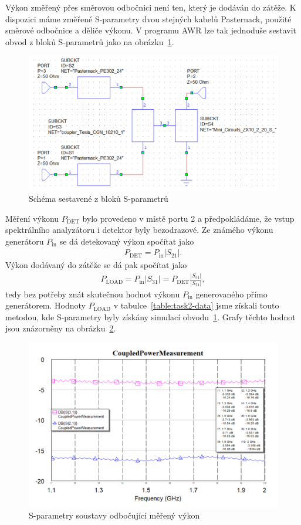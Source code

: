 \documentclass[11pt,a4paper]{article}
\begin{document}
Výkon změřený přes směrovou odbočnici není ten, který je dodáván do zátěže. K dispozici máme změřené S-parametry dvou stejných kabelů Pasternack, použité směrové odbočnice a děliče výkonu. V programu AWR lze tak jednoduše sestavit obvod z bloků S-parametrů jako na obrázku~\ref{fig:task2-sparametry}.
\begin{figure}[!ht]
    \centering
    \includegraphics[width=.8\textwidth]{src/task2-sparametry.png}
    \caption{\label{fig:task2-sparametry}Schéma sestavené z bloků S-parametrů}
\end{figure}
Měření výkonu $P_{\mathrm{DET}}$ bylo provedeno v místě portu 2 a předpokládáme, že vstup spektrálního analyzátoru i detektor byly bezodrazové. Ze známého výkonu generátoru $P_{\mathrm{in}}$ se dá detekovaný výkon spočítat jako
\begin{align}
    P_{\mathrm{DET}} = P_{\mathrm{in}} \left|S_{21}\right|.
\end{align}
Výkon dodávaný do zátěže se dá pak spočítat jako
\begin{align}
    P_{\mathrm{LOAD}} = P_{\mathrm{in}} \left|S_{31}\right| = P_{\mathrm{DET}} \frac{\left|S_{31}\right|}{\left|S_{21}\right|},
\end{align}
tedy bez potřeby znát skutečnou hodnot výkonu $P_{\mathrm{in}}$ generovaného přímo generátorem. Hodnoty $P_{\mathrm{LOAD}}$ v tabulce~\ref{table:task2-data} jsme získali touto metodou, kde S-parametry byly získány simulací obvodu~\ref{fig:task2-sparametry}. Grafy těchto hodnot jsou znázorněny na obrázku~\ref{fig:task2-sparameter-data}.
\begin{figure}[!ht]
    \centering
    \includegraphics[width=.8\textwidth]{src/task2-sparameter_data.png}
    \caption{\label{fig:task2-sparameter-data}S-parametry soustavy odbočující měřený výkon}
\end{figure}
\end{document}
